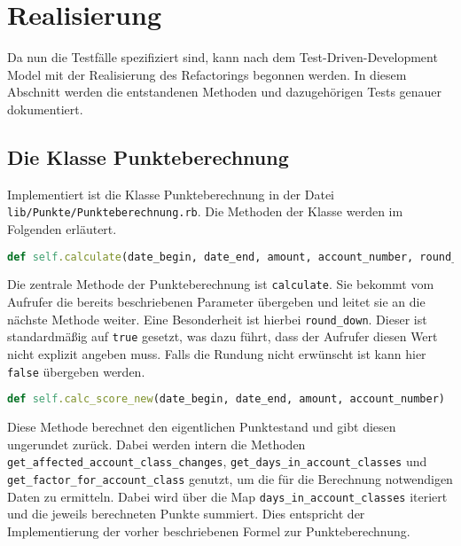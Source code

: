 \documentclass[12pt]{scrreprt}
\begin{document}
\section{Realisierung}

Da nun die Testfälle spezifiziert sind, kann nach dem Test-Driven-Development Model mit der Realisierung des Refactorings begonnen werden. In diesem Abschnitt werden die entstandenen Methoden und dazugehörigen Tests genauer dokumentiert.

\subsection{Die Klasse Punkteberechnung}

Implementiert ist die Klasse Punkteberechnung in der Datei \newline\verb+lib/Punkte/Punkteberechnung.rb+. Die Methoden der Klasse werden im Folgenden erläutert.\\

\begin{lstlisting}[language=Ruby]
def self.calculate(date_begin, date_end, amount, account_number, round_down = true)
\end{lstlisting}
Die zentrale Methode der Punkteberechnung ist \verb+calculate+. Sie bekommt vom Aufrufer die bereits beschriebenen Parameter übergeben und leitet sie an die nächste Methode weiter. Eine Besonderheit ist hierbei \verb+round_down+. Dieser ist standardmäßig auf \verb+true+ gesetzt, was dazu führt, dass der Aufrufer diesen Wert nicht explizit angeben muss. Falls die Rundung nicht erwünscht ist kann hier \verb+false+ übergeben werden. \\

\begin{lstlisting}[language=Ruby]
def self.calc_score_new(date_begin, date_end, amount, account_number)
\end{lstlisting}
Diese Methode berechnet den eigentlichen Punktestand und gibt diesen ungerundet zurück. Dabei werden intern die Methoden \verb+get_affected_account_class_changes+, \verb+get_days_in_account_classes+ und \verb+get_factor_for_account_class+ genutzt, um die für die Berechnung  notwendigen Daten zu ermitteln. Dabei wird über die Map \newline\verb+days_in_account_classes+ iteriert und die jeweils berechneten Punkte summiert. Dies entspricht der Implementierung der vorher beschriebenen Formel zur Punkteberechnung. \\
\end{document}

